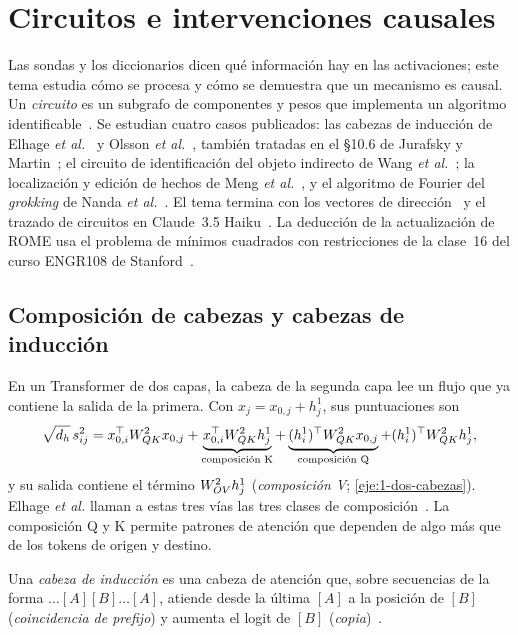 \chapter{Circuitos e intervenciones causales}
\label{tema:5}

Las sondas y los diccionarios dicen qué información hay en las activaciones; este tema estudia cómo se procesa y cómo se demuestra que un mecanismo es causal. Un \emph{circuito} es un subgrafo de componentes y pesos que implementa un algoritmo identificable~\cite{olah-zoom}. Se estudian cuatro casos publicados: las cabezas de inducción de Elhage \emph{et al.}~\cite[«Two-Layer Attention-Only Transformers»]{elhage21} y Olsson \emph{et al.}~\cite{olsson}, también tratadas en el §10.6 de Jurafsky y Martin~\cite{jm3}; el circuito de identificación del objeto indirecto de Wang \emph{et al.}~\cite{wang-ioi}; la localización y edición de hechos de Meng \emph{et al.}~\cite{meng}, y el algoritmo de Fourier del \emph{grokking} de Nanda \emph{et al.}~\cite{nanda}. El tema termina con los vectores de dirección~\cite{turner,arditi} y el trazado de circuitos en Claude~3.5 Haiku~\cite{lindsey}. La deducción de la actualización de ROME usa el problema de mínimos cuadrados con restricciones de la clase~16 del curso ENGR108 de Stanford~\cite{engr108}.

\section{Composición de cabezas y cabezas de inducción}

En un Transformer de dos capas, la cabeza de la segunda capa lee un flujo que ya contiene la salida de la primera. Con $x_j=x_{0,j}+h^{1}_j$, sus puntuaciones son
\[
\sqrt{d_h}\,s^{2}_{ij}=x_{0,i}^{\top}W_{QK}^{2}x_{0,j}+\underbrace{x_{0,i}^{\top}W_{QK}^{2}h^{1}_j}_{\text{composición K}}+\underbrace{(h^{1}_i)^{\top}W_{QK}^{2}x_{0,j}}_{\text{composición Q}}+(h^{1}_i)^{\top}W_{QK}^{2}h^{1}_j,
\]
y su salida contiene el término $W_{OV}^{2}h^{1}_j$ (\emph{composición V}; \cref{eje:1-dos-cabezas}). Elhage \emph{et al.} llaman a estas tres vías las tres clases de composición~\cite[«Three Kinds of Composition»]{elhage21}. La composición Q y K permite patrones de atención que dependen de algo más que de los tokens de origen y destino.

\begin{definicion}\label{def:induccion}
Una \emph{cabeza de inducción} es una cabeza de atención que, sobre secuencias de la forma $\ldots[A][B]\ldots[A]$, atiende desde la última $[A]$ a la posición de $[B]$ (\emph{coincidencia de prefijo}) y aumenta el logit de $[B]$ (\emph{copia})~\cite{olsson}.
\end{definicion}

